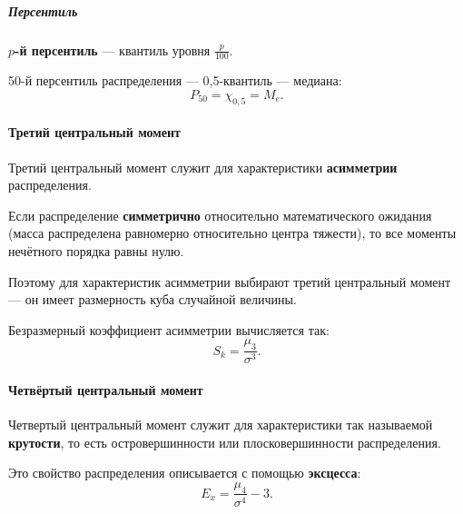 \documentclass[a4paper]{article}
\newcommand{\key}[1]{{\color{Medium}\bfseries #1}}
\begin{document}
                    \subparagraph{Персентиль}

                        \key{\boldmath$p$-й персентиль} --- квантиль уровня $\frac{p}{100}$.

                        50-й персентиль распределения --- 0,5-квантиль --- медиана:
                        \begin{equation*}
                            P_{50} = \chi_{0,5} = M_e .
                        \end{equation*}

                \paragraph{Третий центральный момент}

                    Третий центральный момент служит для характеристики \key{асимметрии} распределения.
                    
                    Если распределение \key{симметрично} относительно математического ожидания (масса распределена равномерно относительно центра тяжести), то все моменты нечётного порядка равны нулю.
                    
                    Поэтому для характеристик асимметрии выбирают третий центральный момент --- он имеет размерность куба случайной величины.
                    
                    Безразмерный коэффициент асимметрии вычисляется так:
                    \begin{equation*}
                        S_k = \frac{\mu_3}{\sigma^3} .
                    \end{equation*}

                \paragraph{Четвёртый центральный момент}

                    Четвертый центральный момент служит для характеристики так называемой \key{крутости}, то есть островершинности или плосковершинности распределения.
                    
                    Это свойство распределения описывается с помощью \key{эксцесса}:
                    \begin{equation*}
                        E_x = \frac{\mu_4}{\sigma^4} - 3 .
                    \end{equation*}
\end{document}
